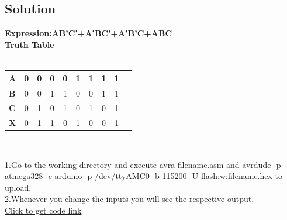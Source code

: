 \documentclass[10pt]{report}
\begin{document}
\begin{multicols}{2}
\section{Solution} 
\centering
\textbf{Expression:AB'C'+A'BC'+A'B'C+ABC}\\
\textbf{Truth Table}\\
\
\\\begin{tabular}{|l|c|c|c|c|c|c|c|c|c|}
\hline
\textbf{A} & 0 & 0 & 0 & 0 & 1 & 1 & 1 & 1\\
\hline
\textbf{B} & 0 & 0 & 1 & 1 & 0 & 0 & 1 & 1\\
\hline
\textbf{C} & 0 & 1 & 0 & 1 & 0 & 1 & 0 & 1\\
\hline
\textbf{X} & 0 & 1 & 1 & 0 & 1 & 0 & 0 & 1\\
\hline
\end{tabular}\\
\vspace{1cm}
\raggedright 1.Go to the working directory and execute avra filename.asm and avrdude -p atmega328 -c arduino -p /dev/ttyAMC0 -b 115200 -U flash:w:filename.hex to upload.\\
2.Whenever you change the inputs you will see the respective output. \\
\vspace{1cm}
\href{https://github.com/DivyaSai9621///FWC/blob/main/assignment-1/ide/codes/src/main.cpp}{Click to get code link}
\end{multicols}
\end{document}
